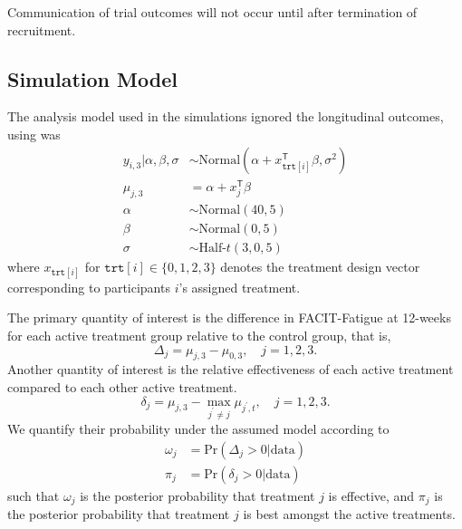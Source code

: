 \documentclass[11pt,parskip=half-]{scrartcl}
\begin{document}
Communication of trial outcomes will not occur until after termination of recruitment.

\clearpage

\printbibliography[heading=bibintoc]

\clearpage

\label{trial-simulations}

\subsection*{Simulation Model}

The analysis model used in the simulations ignored the longitudinal outcomes, using was
$$
  \begin{aligned}
    y_{i,3}|\alpha,\beta,\sigma & \sim \text{Normal}(\alpha + x_{\texttt{trt}[i]}^\mathsf{T}\beta, \sigma^2) \\
    \mu_{j,3}                   & = \alpha + x_j^\mathsf{T}\beta                                             \\
    \alpha                      & \sim \text{Normal}(40, 5)                                                  \\
    \beta                       & \sim \text{Normal}(0, 5)                                                   \\
    \sigma                      & \sim \text{Half-}t(3, 0, 5)
  \end{aligned}
$$
where $x_{\texttt{trt}[i]}$ for $\texttt{trt}[i]\in\{0,1,2,3\}$ denotes the treatment design vector corresponding to participants $i$'s assigned treatment.

The primary quantity of interest is the difference in FACIT-Fatigue at 12-weeks for each active treatment group relative to the control group, that is,
$$
  \Delta_j = \mu_{j,3} - \mu_{0,3},\quad j=1,2,3.
$$
Another quantity of interest is the relative effectiveness of each active treatment compared to each other active treatment.
$$
  \delta_j = \mu_{j,3} - \max_{j^\prime\ne j} \mu_{j^\prime,t},\quad j=1,2,3.
$$
We quantify their probability under the assumed model according to
$$
  \begin{aligned}
    \omega_j & = \text{Pr}(\Delta_j > 0 | \text{data}) \\
    \pi_j    & = \text{Pr}(\delta_j > 0|\text{data})
  \end{aligned}
$$
such that $\omega_j$ is the posterior probability that treatment $j$ is effective, and $\pi_j$ is the posterior probability that treatment $j$ is best amongst the active treatments.
\end{document}
